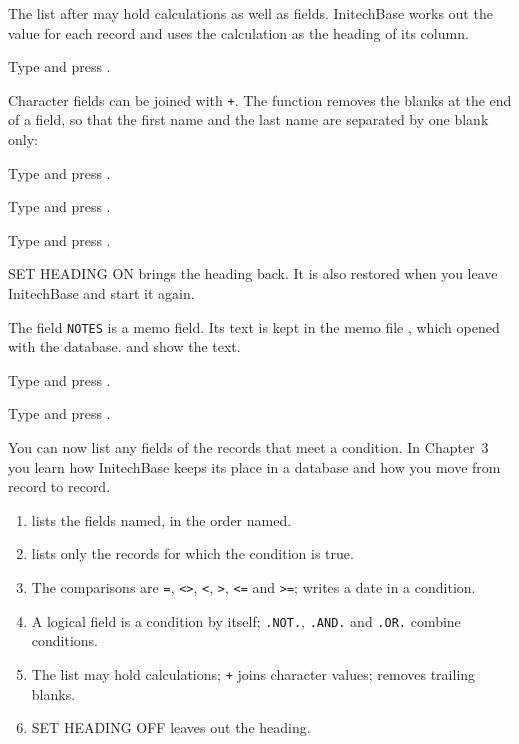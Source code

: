 The list after  may hold calculations as well as fields.  InitechBase
works out the value for each record and uses the calculation as the heading of
its column.
\begin{Steps}[resume]
\item Type  and press .
\end{Steps}
Character fields can be joined with \texttt{+}.  The function 
removes the blanks at the end of a field, so that the first name and the last
name are separated by one blank only:
\begin{Steps}[resume]
\item Type  and
press .
\end{Steps}

\begin{Steps}[resume]
\item Type  and press .
\item Type  and press .
\end{Steps}
SET HEADING ON brings the heading back.  It is also restored when you leave
InitechBase and start it again.

The field \texttt{NOTES} is a memo field.  Its text is kept in the memo file
, which  opened with the database.   and
 show the text.
\begin{Steps}[resume]
\item Type  and press .
\item Type  and press .
\end{Steps}

You can now list any fields of the records that meet a condition.  In
Chapter~3 you learn how InitechBase keeps its place in a database and how you
move from record to record.

\begin{enumerate}
\item {}  lists the fields named, in the order named.
\item {}  lists only the records for which the condition is
  true.
\item The comparisons are \texttt{=}, \texttt{<>}, \texttt{<}, \texttt{>},
  \texttt{<=} and \texttt{>=};  writes a date in a condition.
\item A logical field is a condition by itself; \texttt{.NOT.}, \texttt{.AND.}
  and \texttt{.OR.} combine conditions.
\item The list may hold calculations; \texttt{+} joins character values;
   removes trailing blanks.
\item SET HEADING OFF leaves out the heading.
\end{enumerate}
